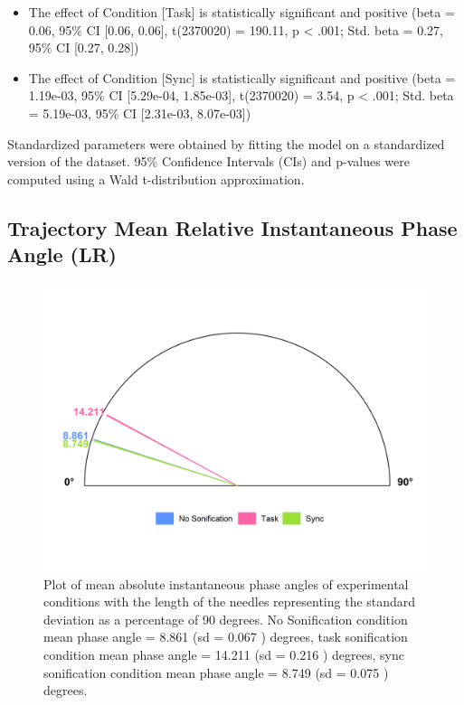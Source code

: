 \documentclass[10pt,a4paper,onecolumn]{article}
\providecommand{\tightlist}{%
  \setlength{\itemsep}{0pt}\setlength{\parskip}{0pt}}
\begin{document}
\begin{itemize}
\tightlist
\item
  The effect of Condition {[}Task{]} is statistically significant and positive (beta = 0.06, 95\% CI {[}0.06, 0.06{]}, t(2370020) = 190.11, p \textless{} .001; Std. beta = 0.27, 95\% CI {[}0.27, 0.28{]})
\item
  The effect of Condition {[}Sync{]} is statistically significant and positive (beta = 1.19e-03, 95\% CI {[}5.29e-04, 1.85e-03{]}, t(2370020) = 3.54, p \textless{} .001; Std. beta = 5.19e-03, 95\% CI {[}2.31e-03, 8.07e-03{]})
\end{itemize}

Standardized parameters were obtained by fitting the model on a standardized version of the dataset. 95\% Confidence Intervals (CIs) and p-values were computed using a Wald t-distribution approximation.

\hypertarget{trajectory-mean-relative-instantaneous-phase-angle-lr-1}{%
\subsection{Trajectory Mean Relative Instantaneous Phase Angle (LR)}\label{trajectory-mean-relative-instantaneous-phase-angle-lr-1}}

\begin{figure}[h]

{\centering \includegraphics[width=1\linewidth]{figures/mean_condition_phase_angles_mean_sd} 

}

\caption{Plot of mean absolute instantaneous phase angles of experimental conditions with the length of the needles representing the standard deviation as a percentage of 90 degrees. No Sonification condition mean phase angle =  8.861 (sd =  0.067 ) degrees, task sonification condition mean phase angle =  14.211 (sd =  0.216 ) degrees, sync sonification condition mean phase angle =  8.749 (sd =  0.075 ) degrees.}\label{fig:mean-instantaneous-phase-angle-circular-plot}
\end{figure}
\end{document}
